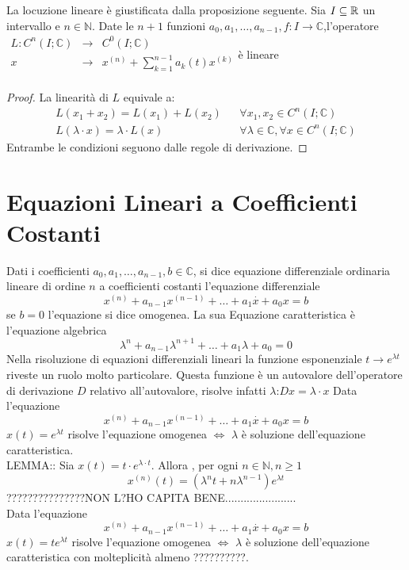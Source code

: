 \observation
La locuzione lineare è giustificata dalla proposizione seguente.
\proposition
Sia $I\subseteq \mathbb{R}$ un intervallo e $n\in\mathbb{N}$. Date le $n+1$ funzioni $a_0,a_1,\ldots,a_{n-1},f:I\to\mathbb{C}$,l'operatore 
$\begin{array}{rcl} 
L: C^n(I;\mathbb{C}) & \to & C^0(I;\mathbb{C}) \\
x & \to & x^{(n)}+\sum\limits_{k=1}^{n-1}a_k(t)x^{(k)} \\ 
\end{array}$è lineare
\begin{proof}
	La linearità di $L$ equivale a:
	$$ \begin{matrix}L(x_1+x_2)=L(x_1)+L(x_2) && \forall x_1,x_2\in C^n(I;\mathbb{C})\\L(\lambda\cdot x)=\lambda\cdot L(x) && \forall\lambda\in\mathbb{C}, \forall x\in C^n(I;\mathbb{C})\end{matrix} $$
	Entrambe le condizioni  seguono dalle regole di derivazione.
\end{proof}
\section{Equazioni Lineari a Coefficienti Costanti}
Dati i coefficienti $a_0,a_1,\ldots,a_{n-1},b\in\mathbb{C}$, si dice equazione differenziale ordinaria lineare di ordine $n$ a coefficienti costanti l'equazione differenziale
$$x^{(n)}+a_{n-1}x^{(n-1)}+\ldots+a_1\overset{\cdot}{x}+a_0x=b$$
se $b=0$ l'equazione si dice omogenea. La sua Equazione caratteristica è l'equazione algebrica
$$\lambda^n+a_{n-1}\lambda^{n+1}+\ldots+a_1\lambda+a_0=0$$ 
\observation
Nella risoluzione di equazioni differenziali lineari la funzione esponenziale $t\to e^{\lambda t}$ riveste un ruolo molto particolare. Questa funzione è un autovalore dell'operatore di derivazione $D$ relativo all'autovalore, risolve infatti $\lambda$:$Dx=\lambda\cdot x$ 
\proposition
Data l'equazione
$$x^{(n)}+a_{n-1}x^{(n-1)}+\ldots+a_1\overset{\cdot}{x}+a_0x=b$$
$x(t)=e^{\lambda t}$ risolve l'equazione omogenea $\Leftrightarrow$ $\lambda$ è soluzione dell'equazione caratteristica.\\

LEMMA:: Sia $x(t)=t\cdot e^{\lambda\cdot t}$. Allora , per ogni $n\in\mathbb{N}, n\ge 1$
$$x^{(n)}(t)=\left(\lambda^nt+n\lambda^{n-1}\right)e^{\lambda t}$$
???????????????NON L?HO CAPITA BENE.......................\\
\proposition
Data l'equazione 
$$x^{(n)}+a_{n-1}x^{(n-1)}+\ldots+a_1\overset{\cdot}{x}+a_0x=b$$
$x(t)=te^{\lambda t}$ risolve l'equazione omogenea $\Leftrightarrow$ $\lambda$ è soluzione dell'equazione caratteristica con molteplicità almeno ??????????.






